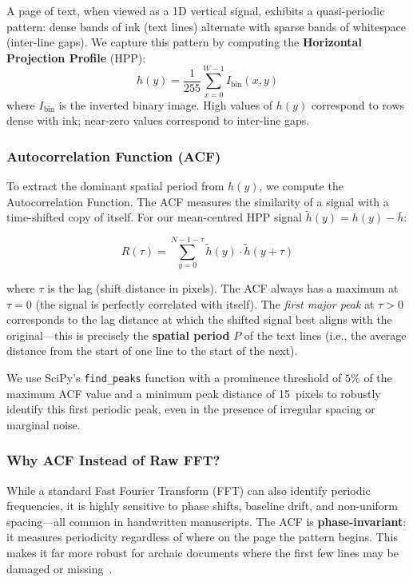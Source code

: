 \documentclass[12pt, a4paper]{article}
\begin{document}
A page of text, when viewed as a 1D vertical signal, exhibits a quasi-periodic pattern: dense bands of ink (text lines) alternate with sparse bands of whitespace (inter-line gaps). We capture this pattern by computing the \textbf{Horizontal Projection Profile} (HPP):
\begin{equation}
    h(y) = \frac{1}{255} \sum_{x=0}^{W-1} I_{\text{bin}}(x, y)
    \label{eq:hpp}
\end{equation}
where $I_{\text{bin}}$ is the inverted binary image. High values of $h(y)$ correspond to rows dense with ink; near-zero values correspond to inter-line gaps.

\subsubsection{Autocorrelation Function (ACF)}

To extract the dominant spatial period from $h(y)$, we compute the Autocorrelation Function. The ACF measures the similarity of a signal with a time-shifted copy of itself. For our mean-centred HPP signal $\tilde{h}(y) = h(y) - \bar{h}$:

\begin{equation}
    R(\tau) = \sum_{y=0}^{N-1-\tau} \tilde{h}(y) \cdot \tilde{h}(y + \tau)
    \label{eq:acf}
\end{equation}

where $\tau$ is the lag (shift distance in pixels). The ACF always has a maximum at $\tau = 0$ (the signal is perfectly correlated with itself). The \emph{first major peak} at $\tau > 0$ corresponds to the lag distance at which the shifted signal best aligns with the original---this is precisely the \textbf{spatial period} $P$ of the text lines (i.e., the average distance from the start of one line to the start of the next).

We use SciPy's \texttt{find\_peaks} function with a prominence threshold of $5\%$ of the maximum ACF value and a minimum peak distance of 15~pixels to robustly identify this first periodic peak, even in the presence of irregular spacing or marginal noise.

\subsubsection{Why ACF Instead of Raw FFT?}

While a standard Fast Fourier Transform (FFT) can also identify periodic frequencies, it is highly sensitive to phase shifts, baseline drift, and non-uniform spacing---all common in handwritten manuscripts. The ACF is \textbf{phase-invariant}: it measures periodicity regardless of where on the page the pattern begins. This makes it far more robust for archaic documents where the first few lines may be damaged or missing~\cite{ogorman1993}.
\end{document}
